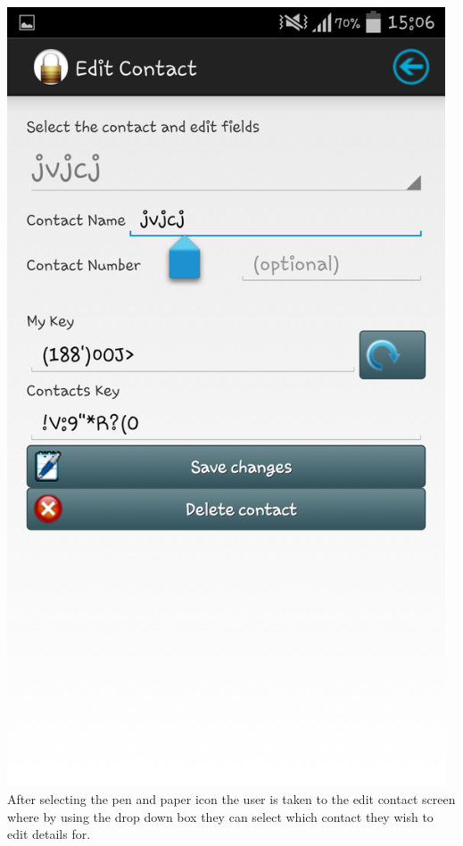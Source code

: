 \begin{center}
 \includegraphics[width=13cm]{screenshots/normal/4_EditContact.png}
 After selecting the pen and paper icon the user is taken to the edit contact screen where by using the drop down box they can select which contact they wish to edit details for.
\end{center}
